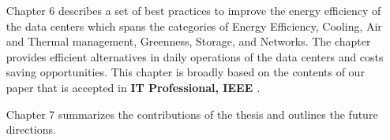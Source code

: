 \documentclass[review]{elsarticle}
\begin{document}
\begin{itemize}
	
	\item[Chapter 6] 
	describes a set of best practices to improve the energy efficiency of the data centers which spans the categories of Energy Efficiency, Cooling, Air and Thermal management, Greenness, Storage, and Networks.
	The chapter provides efficient alternatives in daily operations of the data centers and costs saving opportunities. This chapter is broadly based on the contents of our paper that is accepted in \textbf{IT Professional, IEEE \cite{25}}.  
	
	
	
	\item[Chapter 7]%
	summarizes the contributions of the thesis and outlines the future directions. 
	
\end{itemize}

\end{document}
